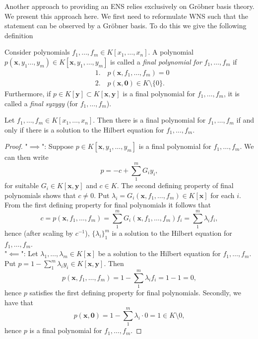 Another approach to providing an ENS relies exclusively on Gröbner basis theory. We present this approach here. We first need to reformulate WNS such that the statement can be observed by a Gröbner basis. To do this we give the following definition
\begin{definition}\label{FinPol : 1}
    Consider polynomials $f_1,\dots,f_m\in K[x_1,\dots,x_n]$. A polynomial $p(\mathbf{x},y_1\dots,y_m) \in K[\mathbf{x},y_1,\dots,y_m]$ is called a \textit{final polynomial for} $f_1,\dots,f_m$ if 
    \begin{align*}
        &1.\quad p(\mathbf{x}, f_1,\dots, f_m) = 0\\
        &2. \quad p(\mathbf{x},\mathbf{0}) \in  K\setminus\{0\}.
    \end{align*}
    Furthermore, if $p\in K[\mathbf{y}]\subset K[\mathbf{x},\mathbf{y}]$ is a final polynomial for $f_1,\dots,f_m$, it is called a \textit{final syzygy} (for $f_1,\dots,f_m$).
\end{definition}
\begin{lemma}
    Let $f_1,\dots,f_m\in K[x_1,\dots,x_n]$. Then there is a final polynomial for $f_1,\dots,f_m$ if and only if there is a solution to the Hilbert equation for $f_1,\dots,f_m$.
\end{lemma}
\begin{proof}
    "$\implies$": Suppose $p\in K[\mathbf{x},y_1,\dots,y_m]$ is a final polynomial for $f_1,\dots,f_m$. We can then write
    $$p = -c+\sum_1^m G_iy_i,$$
    for suitable $G_i\in K[\mathbf{x},\mathbf{y}]$ and $c\in K$. The second defining property of final polynomials shows that $c\neq 0$. Put $\lambda_i = G_i(\mathbf{x},f_1,\dots,f_m)\in K[\mathbf{x}]$ for each $i$. From the first defining property for final polynomials it follows that 
    $$c = p(\mathbf{x},f_1,\dots,f_m)= \sum_1^m G_i(\mathbf{x},f_1,\dots,f_m)f_i = \sum_1^m \lambda_if_i,$$
    hence (after scaling by $c^{-1}$), $\{\lambda_i\}_1^m$ is a solution to the Hilbert equation for $f_1,\dots,f_m$.\\
    "$\impliedby$": Let $\lambda_1,\dots,\lambda_m\in K[\mathbf{x}]$ be a solution to the Hilbert equation for $f_1,\dots,f_m$. Put $p = 1-\sum_1^m \lambda_iy_i\in K[\mathbf{x},\mathbf{y}]$. Then
    $$p(\mathbf{x},f_1,\dots,f_m)=1-\sum_1^m \lambda_if_i = 1-1=0,$$
    hence $p$ satisfies the first defining property for final polynomials. Secondly, we have that 
    $$p(\mathbf{x},\mathbf{0})= 1-\sum_1^m \lambda_i\cdot 0 = 1\in K\setminus 0,$$
    hence $p$ is a final polynomial for $f_1,\dots,f_m$.
\end{proof}
